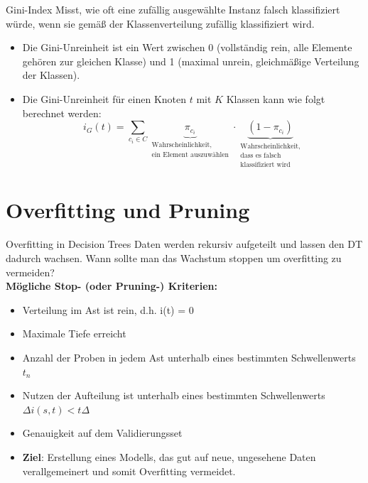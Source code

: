 \documentclass{beamer}
\begin{document}
\begin{frame}{Gini-Index}
Misst, wie oft eine zufällig ausgewählte Instanz falsch klassifiziert würde, wenn sie gemäß der Klassenverteilung zufällig klassifiziert wird.

\begin{itemize}
    \item Die Gini-Unreinheit ist ein Wert zwischen 0 (vollständig rein, alle Elemente gehören zur gleichen Klasse) und 1 (maximal unrein, gleichmäßige Verteilung der Klassen).
    \item Die Gini-Unreinheit für einen Knoten $t$ mit $K$ Klassen kann wie folgt berechnet werden:
    \[
    i_G (t) = \sum_{c_i \in C} \underbrace{\pi_{c_i}}_{\substack{\text{Wahrscheinlichkeit,} \\ \text{ein Element auszuwählen}}} \cdot \underbrace{(1 - \pi_{c_i})}_{\substack{\text{Wahrscheinlichkeit,} \\ \text{dass es falsch} \\ \text{klassifiziert wird}}}
    \]
\end{itemize}
\end{frame}


\section{Overfitting und Pruning}

\begin{frame}{Overfitting in Decision Trees}
Daten werden rekursiv aufgeteilt und lassen den DT dadurch wachsen. Wann sollte man das Wachstum stoppen um overfitting zu vermeiden?\\
\textbf{Mögliche Stop- (oder Pruning-) Kriterien:}
\begin{itemize}
\item Verteilung im Ast ist rein, d.h. i(t) = 0
\item Maximale Tiefe erreicht
\item Anzahl der Proben in jedem Ast unterhalb eines bestimmten Schwellenwerts $t_n$
\item Nutzen der Aufteilung ist unterhalb eines bestimmten Schwellenwerts $\Delta i(s,t) < t\Delta$
\item Genauigkeit auf dem Validierungsset
\item {\textbf{Ziel}: Erstellung eines Modells, das gut auf neue, ungesehene Daten verallgemeinert und somit Overfitting vermeidet.}
\end{itemize}
\end{frame}
\end{document}
